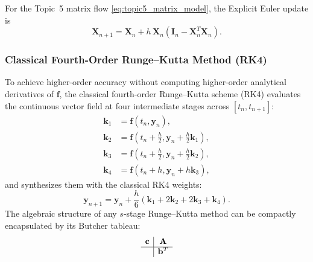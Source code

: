 For the Topic~5 matrix flow \eqref{eq:topic5_matrix_model}, the
Explicit Euler update is
\begin{equation}
\label{eq:topic5_explicit_euler}
\mathbf{X}_{n+1}
=
\mathbf{X}_n
+h\,\mathbf{X}_n
\left(\mathbf{I}_n-\mathbf{X}_n^T\mathbf{X}_n\right).
\end{equation}

\subsubsection{Classical Fourth-Order Runge--Kutta Method (RK4)}
To achieve higher-order accuracy without computing higher-order analytical derivatives of $\mathbf{f}$, the classical fourth-order Runge--Kutta scheme (RK4) evaluates the continuous vector field at four intermediate stages across $[t_n, t_{n+1}]$:
\begin{align}
\mathbf{k}_1 &= \mathbf{f}(t_n, \mathbf{y}_n), \label{eq:rk4_k1} \\
\mathbf{k}_2 &= \mathbf{f}\left(t_n + \frac{h}{2}, \mathbf{y}_n + \frac{h}{2}\mathbf{k}_1\right), \label{eq:rk4_k2} \\
\mathbf{k}_3 &= \mathbf{f}\left(t_n + \frac{h}{2}, \mathbf{y}_n + \frac{h}{2}\mathbf{k}_2\right), \label{eq:rk4_k3} \\
\mathbf{k}_4 &= \mathbf{f}(t_n + h, \mathbf{y}_n + h\mathbf{k}_3), \label{eq:rk4_k4}
\end{align}
and synthesizes them with the classical RK4 weights:
\begin{equation}
\label{eq:rk4_update}
\mathbf{y}_{n+1} = \mathbf{y}_n + \frac{h}{6} \left(\mathbf{k}_1 + 2\mathbf{k}_2 + 2\mathbf{k}_3 + \mathbf{k}_4\right).
\end{equation}
The algebraic structure of any $s$-stage Runge--Kutta method can be compactly encapsulated by its Butcher tableau:
\begin{equation}
\label{eq:butcher_general}
\begin{array}{c|c}
\mathbf{c} & \mathbf{A} \\
\hline
& \mathbf{b}^T
\end{array}
\end{equation}

